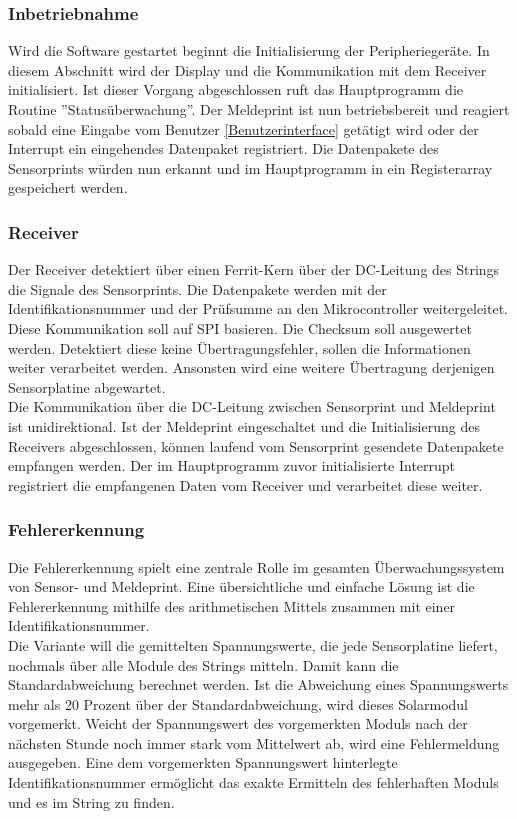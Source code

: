 \subsubsection{Inbetriebnahme}
Wird die Software gestartet beginnt die Initialisierung der Peripheriegeräte. In diesem Abschnitt wird der Display und die Kommunikation mit dem Receiver initialisiert. Ist dieser Vorgang abgeschlossen ruft das Hauptprogramm die Routine ''Statusüberwachung''. Der Meldeprint ist nun betriebsbereit und reagiert sobald eine Eingabe vom Benutzer \ref{Benutzerinterface} getätigt wird oder der Interrupt ein eingehendes Datenpaket registriert. Die Datenpakete des Sensorprints würden nun erkannt und im Hauptprogramm in ein Registerarray gespeichert werden.

\subsubsection{Receiver}
Der Receiver detektiert über einen Ferrit-Kern über der DC-Leitung des Strings die Signale des Sensorprints. Die Datenpakete werden mit der Identifikationsnummer und der Prüfsumme an den Mikrocontroller weitergeleitet. Diese Kommunikation soll auf SPI basieren. Die Checksum soll ausgewertet werden. Detektiert diese keine Übertragungsfehler, sollen die Informationen weiter verarbeitet werden. Ansonsten wird eine weitere Übertragung derjenigen Sensorplatine abgewartet. \\
Die Kommunikation über die DC-Leitung zwischen Sensorprint und Meldeprint ist unidirektional. Ist der Meldeprint eingeschaltet und die Initialisierung des Receivers abgeschlossen, können laufend vom Sensorprint gesendete Datenpakete empfangen werden. Der im Hauptprogramm zuvor initialisierte Interrupt registriert die empfangenen Daten vom Receiver und verarbeitet diese weiter.

\subsubsection{Fehlererkennung}
Die Fehlererkennung spielt eine zentrale Rolle im gesamten Überwachungssystem von Sensor- und Meldeprint. Eine übersichtliche und einfache Lösung ist die Fehlererkennung mithilfe des arithmetischen Mittels zusammen mit einer Identifikationsnummer.\\
Die Variante will die gemittelten Spannungswerte, die jede Sensorplatine liefert, nochmals über alle Module des Strings mitteln. Damit kann die Standardabweichung berechnet werden. Ist die Abweichung eines Spannungswerts mehr als 20 Prozent über der Standardabweichung, wird dieses Solarmodul vorgemerkt. Weicht der Spannungswert des vorgemerkten Moduls nach der nächsten Stunde noch immer stark vom Mittelwert ab, wird eine Fehlermeldung ausgegeben. Eine dem vorgemerkten Spannungswert hinterlegte Identifikationsnummer ermöglicht das exakte Ermitteln des fehlerhaften Moduls und es im String zu finden.

